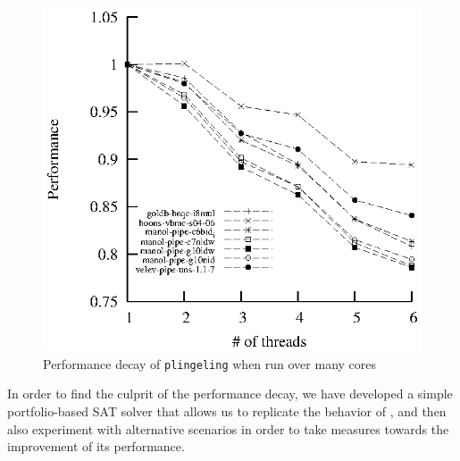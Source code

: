 \documentclass{llncs}
\begin{document}
\begin{figure}[tp]
  \centering
  \includegraphics[scale=1]{plingeling_6cores_speedup}
  \caption{Performance decay of {\tt plingeling} when run over many cores}
  \label{fig:decay}
\end{figure}

In order to find the culprit of the performance decay, we have
developed a simple portfolio-based SAT solver that allows us to
replicate the behavior of \pling, and then also experiment with
alternative scenarios in order to take measures towards the
improvement of its performance.
\end{document}
